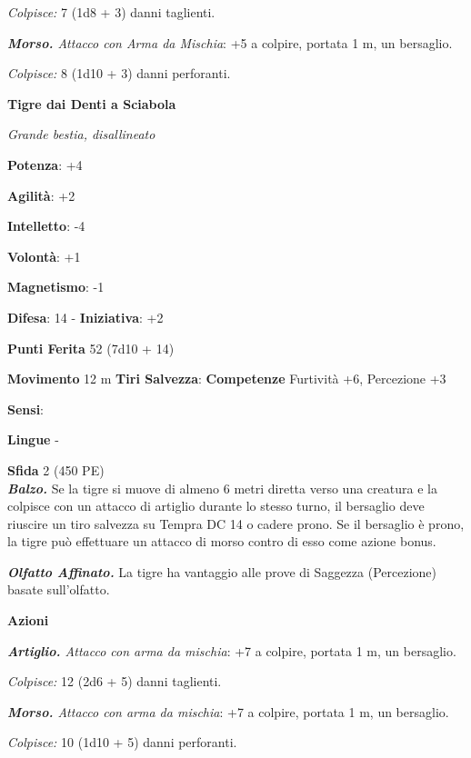 \begin{multicols}{2}
\emph{Colpisce:} 7 (1d8 + 3) danni taglienti.

\emph{\textbf{Morso.} Attacco con Arma da Mischia}: +5 a colpire,
portata 1 m, un bersaglio.

\emph{Colpisce:} 8 (1d10 + 3) danni perforanti.

\textbf{Tigre dai Denti a Sciabola}

\emph{Grande bestia, disallineato}

\textbf{Potenza}: +4

\textbf{Agilità}: +2

\textbf{Intelletto}: -4

\textbf{Volontà}: +1

\textbf{Magnetismo}: -1

\textbf{Difesa}: 14 - \textbf{Iniziativa}: +2

\textbf{Punti Ferita} 52 (7d10 + 14)

\textbf{Movimento} 12 m
\textbf{Tiri Salvezza}:
\textbf{Competenze} Furtività +6, Percezione +3

\textbf{Sensi}: 

\textbf{Lingue} -

\textbf{Sfida} 2 (450 PE)\smallskip\\

\emph{\textbf{Balzo.}} Se la tigre si muove di almeno 6 metri diretta
verso una creatura e la colpisce con un attacco di artiglio durante lo
stesso turno, il bersaglio deve riuscire un tiro salvezza su Tempra DC 14
o cadere prono. Se il bersaglio è prono, la tigre può effettuare un
attacco di morso contro di esso come azione bonus.

\emph{\textbf{Olfatto Affinato.}} La tigre ha vantaggio alle prove di
Saggezza (Percezione) basate sull'olfatto.

\smallskip\textbf{Azioni}

\emph{\textbf{Artiglio.} Attacco con arma da mischia}: +7 a colpire,
portata 1 m, un bersaglio.

\emph{Colpisce:} 12 (2d6 + 5) danni taglienti.

\emph{\textbf{Morso.} Attacco con arma da mischia}: +7 a colpire,
portata 1 m, un bersaglio.

\emph{Colpisce:} 10 (1d10 + 5) danni perforanti.



\end{multicols}
